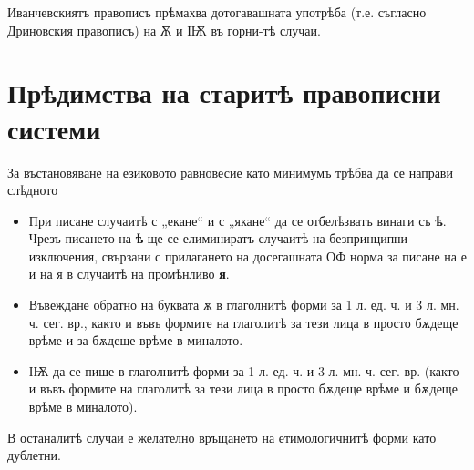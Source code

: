 \documentclass{article}
\begin{document}
	Иванчевскиятъ правописъ прѣмахва дотогавашната употрѣба (т.е. съгласно Дриновския правописъ) на Ѫ и ІѬ въ горни-тѣ случаи.
	
	\section{Прѣдимства на старитѣ правописни системи}
	
	За въстановяване на езиковото равновесие като минимумъ трѣбва да се направи слѣдното 
	
	\begin{itemize}
	\item При писане случаитѣ с „екане“ и с „якане“ да се отбелѣзватъ винаги съ \textbf{ѣ}. Чрезъ писането на \textbf{ѣ} ще се елиминиратъ случаитѣ на безпринципни изключения, свързани с прилагането на досегашната ОФ норма за писане на е и на я в случаитѣ на промѣнливо \textbf{я}.
	
 	\item Въвеждане обратно на буквата ѫ  в глаголнитѣ форми за 1 л. ед. ч. и 3 л. мн. ч. сег. вр., както и въвъ формите на глаголитѣ за тези лица в просто бѫдеще врѣме и за бѫдеще врѣме в миналото.
 	
 	\item ІѬ да се пише в глаголнитѣ форми за 1 л. ед. ч. и 3 л. мн. ч. сег. вр. (както и въвъ формите на глаголитѣ за тези лица в просто бѫдеще врѣме и бѫдеще врѣме в миналото).
	\end{itemize}

	В останалитѣ случаи е желателно връщането на етимологичнитѣ форми като дублетни.
\end{document}
